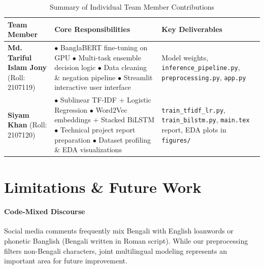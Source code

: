 \documentclass[11pt,a4paper]{article}
\begin{document}
\begin{table}[H]
\centering
\caption{Summary of Individual Team Member Contributions}
\label{tab:work_dist}
\small
\begin{tabularx}{\textwidth}{p{3.2cm}>{\raggedright\arraybackslash}X>{\raggedright\arraybackslash}p{4.8cm}}
\toprule
\textbf{Team Member} & \textbf{Core Responsibilities} & \textbf{Key Deliverables} \\
\midrule
\textbf{Md. Tariful Islam Jony} \newline (Roll: 2107119) & 
$\bullet$ BanglaBERT fine-tuning on GPU \newline
$\bullet$ Multi-task ensemble decision logic \newline
$\bullet$ Data cleaning \& negation pipeline \newline
$\bullet$ Streamlit interactive user interface & 
Model weights, \texttt{inference\_pipeline.py}, \texttt{preprocessing.py}, \texttt{app.py} \\
\midrule
\textbf{Siyam Khan} \newline (Roll: 2107120) & 
$\bullet$ Sublinear TF-IDF + Logistic Regression \newline
$\bullet$ Word2Vec embeddings + Stacked BiLSTM \newline
$\bullet$ Technical project report preparation \newline
$\bullet$ Dataset profiling \& EDA visualizations & 
\texttt{train\_tfidf\_lr.py}, \texttt{train\_bilstm.py}, \texttt{main.tex} report, EDA plots in \texttt{figures/} \\
\bottomrule
\end{tabularx}
\end{table}

\section{Limitations \& Future Work}
\paragraph{Code-Mixed Discourse} Social media comments frequently mix Bengali with English loanwords or phonetic Banglish (Bengali written in Roman script). While our preprocessing filters non-Bengali characters, joint multilingual modeling represents an important area for future improvement.
\end{document}
